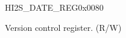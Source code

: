 \begin{register}{H}{I2S\_DATE\_REG}{0x{}0080}\label{regdesc:I2SDATEREG}
%
%
\regnewline%
\begin{regdesc}\begin{reglist}
\label{fielddesc:I2SDATE}\item [I2S\_DATE] Version control register. (R/W)
\end{reglist}\end{regdesc}
\end{register}


